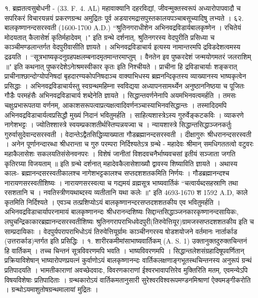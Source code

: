 १. ब्रह्मतत्वसुबोधनी - (33. F. 4. AL)
महावाक्यानि दहरविद्यां, जीवन्मुक्तस्वरूपं अध्यारोपापवादौ च सपरिकरं विचारयन्नयं प्रकरणग्रन्थ अमुद्रितः पूर्व अडयारमद्रासपुस्तकालयपञ्चाबसूच्यादिषु लभ्यते ।
६२. बालकृष्णानन्दसरस्वती (1600-1700 A.D.)
``श्रुतिनगराधीशेन अभिनवद्रविडार्यबालकृष्णेन । रचितेयं मोदयतात् कैलासेशंं कृतिर्महादेवम् ।" इति ग्रन्थे दर्शनात्, श्रुतिनगरस्य वेदपुरीति प्रसिध्या च काञ्चीमण्डलान्तर्गत वेदपुरीवासीति ज्ञायते । अभिनवद्रविडाचार्य इत्यस्य नामान्तरमपि द्रविडदेशत्वमस्य द्रढयति । 
``सूत्रभाष्यकृदनुग्रहपक्षलम्बनादमृतमान्तरमाप्तुम् ।
वैनतेन इव पुष्करदेशं जन्मयोगमतरं जलराशिम् ॥"
इति कथनात् पुष्करदेशेऽनेाश्रमस्वीकार कृतः इति निश्चीयते ।
प्राचीना हि द्रविडाचार्याः शङ्करात् प्राचीनाश्छान्दोग्योपनिषदां बृहदारण्यकोपनिषदाञ्च वाक्याभिधस्य ब्रह्मनन्दिकृतस्य व्याख्यानस्य भाष्यकृत्वेन प्रसिद्धाः । अभिनवद्रविडाचार्यस्तु स्वग्रन्थमहिम्ना स्वविद्यया अध्यापनसामर्थ्येन अनुष्ठाननिष्ठया च पूजितः गौडैः परमहंसैः अभिनवद्रविडाचार्य शब्देनेति ज्ञायते । सिद्धान्तवर्णनेनापि अयमभिनवत्वमर्हति । तमसः चक्षुःप्रभारूपतया वर्णनम्, आकाशसरूपत्वाप्रत्यक्षत्वादिवर्णनञ्चास्याभिनवसिद्धान्तः । तस्मादिदमपि अभिनवद्रविडाचार्यत्वप्रसिद्धौ मुख्यं निदानं भवितुमर्हति ।
साहित्यशास्त्रेऽस्य गुरुर्वेङ्कटकविः । व्याकरणे नागेशभट्टः । ज्योतिश्शास्त्रे स्वयम्प्रकाशतीर्थस्तिप्पन्नयज्वा च । न्यायशास्त्रे सिद्धान्तसिद्धाञ्जनकर्तुः गुरुर्वासुदेवान्दसरस्वती । वेदान्तेऽद्वैतसिद्धिव्याख्याता गौडब्रह्मानन्दसरस्वती । दीक्षागुरुः श्रीधरानन्दसरस्वती । अनेन पूर्णानन्दारब्धा श्रीधरान्ता च गुरु परम्परा निर्दिश्यतेऽत्र ग्रन्थे -
महादेवः श्रीमान् समधिगततत्वो वटुवरः 
महाकैलासेशः सकलयतिसंसेनवनपरः ।
विशेषं जानीतां विशदवचनैर्भाष्यवचसां
इतीयं सञ्जाता जगति कृतिरग्र्या विजयताम् ॥
इति ग्रन्थे दर्शनात् महादेवकैलासेशाख्यौ द्वावस्य शिष्याविति ज्ञायते ।
अथास्य कालः-
ब्रह्मानन्दसरस्वतीकालश्च नागेशभट्टकालश्च सप्तदशशतकमिति निर्णयः । गौडब्रह्मानन्दश्च नारायणसरस्वतीशिष्यः । नारायणसरस्वत्या च गद्यमयं व्रह्मसूत्र भाष्यवार्तिकं ``चत्वार्यब्दसहस्राणि तथा रसशतानि च । नवतिस्त्रीणयथाब्दस्य व्यतीतानि यथा कलेः ॥" इति 4693-1670 श 1592 A.D, काले कृतमिति निर्दिश्यते । एवञ्च तत्प्रशिप्योऽयं बालकृष्णानन्दरसप्तदशशतकीय एव भवितुमर्हति ।
अभिनवद्रविडाचार्यापरनामायं बालकृष्णानन्दः श्रीधरानन्दशिष्यः सिद्दान्तसिद्धाञ्जनकारकृष्णानन्दसायिकः, लघुचन्द्रिकाकारब्रह्मानन्दसरस्वतीशिष्यः श्रुतिनगरापराभिधवेदपुरी(तिरुवेत्तियूर)ग्रामजस्सप्तदशशतकीय इति च साम्प्रदायिकाः । वेदपुर्यपरापराभिधोऽयं तिरुवेत्तियूर्ग्रामः काञ्चीनगरस्य षोडशयोजने वर्तमानः नार्तार्काड (उत्तरार्काड)न्तर्गत इति प्रसिद्धिः ।
१. शारीरकमीमांसाभाष्यवार्तिकम् (A. S. 1)
उक्तानुक्तदुरुक्तचिन्तनं हि वार्तिकम् । तच्च चिन्तनं सूत्रविवरणमपि भवति । भाष्यविवरणमपि । सिद्धान्तलेशसंग्रहादिषूपवर्णितान् प्रक्रियाविशेषान् भाष्यारोपणप्रयत्नं कुर्वाणोऽयं बालकृष्णानन्दः वार्तिकलक्षणाङ्गभूतस्थचिन्तनस्य अनुरूपं ग्रन्थं प्रतिपादयति । भामतीकाराणां अवच्छेदवादः, विवरणकाराणां ईश्वरभावापत्तिरेव मुक्तिरिति मतम्, एवमन्येऽपि विषयविशेषाः प्रतिपादिताः । ग्रन्थकारोऽयं वार्तिकमतानुसारी सुरेश्वरविश्वरूपमण्डनमिश्राणां ऐक्यमङ्गीकरोति । ग्रन्थोऽयमाशुतोषग्रन्थमालायां मुद्रितः ।
